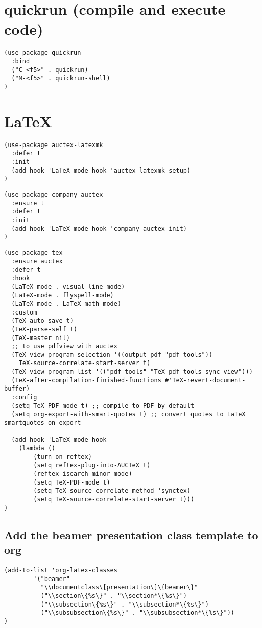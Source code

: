 \documentclass[11pt]{article}
\begin{document}
\section*{quickrun (compile and execute code)}
\label{sec:org537525c}
\begin{verbatim}
(use-package quickrun
  :bind
  ("C-<f5>" . quickrun)
  ("M-<f5>" . quickrun-shell)
)
\end{verbatim}


\section*{\LaTeX{}}
\label{sec:orgc35276f}

\begin{verbatim}
(use-package auctex-latexmk
  :defer t
  :init
  (add-hook 'LaTeX-mode-hook 'auctex-latexmk-setup)
)
\end{verbatim}


\begin{verbatim}
(use-package company-auctex
  :ensure t
  :defer t
  :init
  (add-hook 'LaTeX-mode-hook 'company-auctex-init)
)
\end{verbatim}

\begin{verbatim}
(use-package tex
  :ensure auctex
  :defer t
  :hook
  (LaTeX-mode . visual-line-mode)
  (LaTeX-mode . flyspell-mode)
  (LaTeX-mode . LaTeX-math-mode)
  :custom
  (TeX-auto-save t)
  (TeX-parse-self t)
  (TeX-master nil)
  ;; to use pdfview with auctex
  (TeX-view-program-selection '((output-pdf "pdf-tools"))
    TeX-source-correlate-start-server t)
  (TeX-view-program-list '(("pdf-tools" "TeX-pdf-tools-sync-view")))
  (TeX-after-compilation-finished-functions #'TeX-revert-document-buffer)
  :config
  (setq TeX-PDF-mode t) ;; compile to PDF by default
  (setq org-export-with-smart-quotes t) ;; convert quotes to LaTeX smartquotes on export

  (add-hook 'LaTeX-mode-hook
    (lambda ()
        (turn-on-reftex)
        (setq reftex-plug-into-AUCTeX t)
        (reftex-isearch-minor-mode)
        (setq TeX-PDF-mode t)
        (setq TeX-source-correlate-method 'synctex)
        (setq TeX-source-correlate-start-server t)))
)

\end{verbatim}

\subsection*{Add the beamer presentation class template to org}
\label{sec:org06fea09}
\begin{verbatim}
(add-to-list 'org-latex-classes
        '("beamer"
          "\\documentclass\[presentation\]\{beamer\}"
          ("\\section\{%s\}" . "\\section*\{%s\}")
          ("\\subsection\{%s\}" . "\\subsection*\{%s\}")
          ("\\subsubsection\{%s\}" . "\\subsubsection*\{%s\}"))
)
\end{verbatim}
\end{document}
